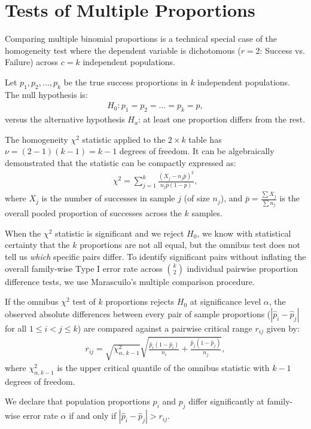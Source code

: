\section{Tests of Multiple Proportions}

Comparing multiple binomial proportions is a technical special case of the homogeneity test where the dependent variable is dichotomous ($r=2$: Success vs. Failure) across $c = k$ independent populations.

\begin{definicion}
	Let $p_1, p_2, \ldots, p_k$ be the true success proportions in $k$ independent populations. The null hypothesis is:
	\begin{align}
		H_0: p_1 = p_2 = \ldots = p_k = p,
	\end{align}
	versus the alternative hypothesis $H_a$: at least one proportion differs from the rest.
	
	The homogeneity $\chi^2$ statistic applied to the $2 \times k$ table has $\nu = (2-1)(k-1) = k-1$ degrees of freedom. It can be algebraically demonstrated that the statistic can be compactly expressed as:
	\begin{align}
		\chi^2 = \sum_{j=1}^k \frac{(X_j - n_j \bar{p})^2}{n_j \bar{p}(1-\bar{p})},
		\label{eq:chi2_k_prop}
	\end{align}
	where $X_j$ is the number of successes in sample $j$ (of size $n_j$), and $\bar{p} = \frac{\sum X_j}{\sum n_j}$ is the overall pooled proportion of successes across the $k$ samples.
\end{definicion}

When the $\chi^2$ statistic is significant and we reject $H_0$, we know with statistical certainty that the $k$ proportions are not all equal, but the omnibus test does not tell us \emph{which} specific pairs differ. To identify significant pairs without inflating the overall family-wise Type I error rate across $\binom{k}{2}$ individual pairwise proportion difference tests, we use Marascuilo's multiple comparison procedure.

\begin{teorema}
	If the omnibus $\chi^2$ test of $k$ proportions rejects $H_0$ at significance level $\alpha$, the observed absolute differences between every pair of sample proportions ($|\hat{p}_i - \hat{p}_j|$ for all $1 \leq i < j \leq k$) are compared against a pairwise critical range $r_{ij}$ given by:
	\begin{align}
		r_{ij} = \sqrt{\chi^2_{\alpha, \, k-1}} \sqrt{\frac{\hat{p}_i(1-\hat{p}_i)}{n_i} + \frac{\hat{p}_j(1-\hat{p}_j)}{n_j}},
		\label{eq:marascuilo}
	\end{align}
	where $\chi^2_{\alpha, k-1}$ is the upper critical quantile of the omnibus statistic with $k-1$ degrees of freedom. 
	
	We declare that population proportions $p_i$ and $p_j$ differ significantly at family-wise error rate $\alpha$ if and only if $|\hat{p}_i - \hat{p}_j| > r_{ij}$.
\end{teorema}
